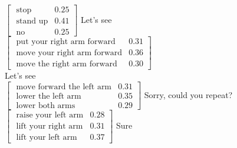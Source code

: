 \begin{Transcript}[p!]
\vspace{4mm} \hspace{1cm} 
\begin{dialogue} 
 $\begin{bmatrix}\text{ stop} & 0.25 \\
\text{ stand up} & 0.41 \\
\text{ no} & 0.25 \end{bmatrix}$ \vspace{3mm}
 Let's see \vspace{1mm} \\
 \vspace{3mm}
  $\begin{bmatrix}\text{ put your right arm forward} & 0.31 \\
\text{ move your right arm forward} & 0.36 \\
\text{ move the right arm forward} & 0.30 \end{bmatrix}$ \vspace{2mm} \\
 \vspace{2mm}
 Let's see \vspace{1mm} \\
 \vspace{3mm}
 $\begin{bmatrix}\text{ move forward the left arm} & 0.31 \\
\text{ lower the left arm} & 0.35 \\
\text{ lower both arms} & 0.29 \end{bmatrix}$ \vspace{3mm}
 Sorry, could you repeat? \vspace{3mm}
 $\begin{bmatrix}\text{ raise your left arm} & 0.28 \\
\text{ lift your right arm} & 0.31 \\
\text{ lift your left arm} & 0.37 \end{bmatrix}$ \vspace{3mm}
 Sure \vspace{1mm} \\
 \\

\end{dialogue}
\end{Transcript}

